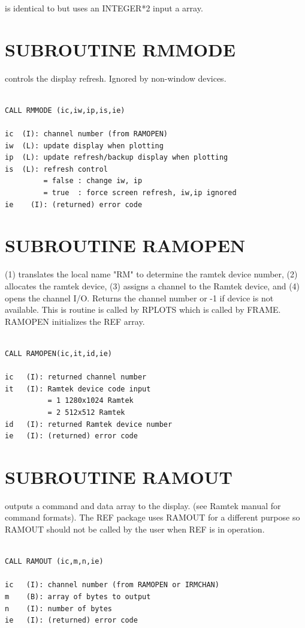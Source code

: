 \documentclass[11pt]{report}
\begin{document}
 is identical to  but uses an INTEGER*2 input a
array.

\section{SUBROUTINE RMMODE}

 controls the  display  refresh.
Ignored by non-window devices.
\begin{verbatim}

CALL RMMODE (ic,iw,ip,is,ie)

ic  (I): channel number (from RAMOPEN)
iw  (L): update display when plotting
ip  (L): update refresh/backup display when plotting
is  (L): refresh control
         = false : change iw, ip
         = true  : force screen refresh, iw,ip ignored
ie    (I): (returned) error code
\end{verbatim}

\section{SUBROUTINE RAMOPEN}

 (1) translates the local name "RM" to determine the ramtek device
number, (2) allocates the ramtek device, (3) assigns a channel to the Ramtek
device, and (4) opens the channel I/O.  Returns the channel number or
-1 if device is not available.  This is routine is called by RPLOTS which
is called by FRAME.  RAMOPEN initializes the REF array.
\begin{verbatim}

CALL RAMOPEN(ic,it,id,ie)

ic   (I): returned channel number
it   (I): Ramtek device code input
          = 1 1280x1024 Ramtek
          = 2 512x512 Ramtek
id   (I): returned Ramtek device number
ie   (I): (returned) error code
\end{verbatim}

\section{SUBROUTINE RAMOUT}

 outputs a command and data array to the  display.
(see Ramtek manual for command formats).  The REF package uses RAMOUT
for a different purpose so RAMOUT should not be called by the user when REF is
in operation.
\begin{verbatim}

CALL RAMOUT (ic,m,n,ie)

ic   (I): channel number (from RAMOPEN or IRMCHAN)
m    (B): array of bytes to output
n    (I): number of bytes
ie   (I): (returned) error code
\end{verbatim}
\end{document}
